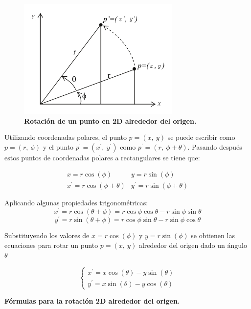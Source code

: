 \begin{center}
\begin{figure}[h]
\includegraphics[width=8cm]{Img/GEO/geo-rot2d.jpg}
\centering
\caption{\textbf{\footnotesize{Rotación de un punto en 2D alrededor del origen.}}}
\end{figure}
\end{center}

Utilizando coordenadas polares, el punto $p = (x, \ y)$ se puede escribir como $p = (r, \ \phi)$ y el punto $p^{\prime} = ({x}^{\prime},\ {y}^{\prime})$ como $p^{\prime} = (r, \ \phi + \theta)$. Pasando después estos puntos de coordenadas polares a rectangulares se tiene que:

$$
\begin{array}{rccl}
x = r \cos(\phi)  & y = r \sin(\phi)\\
{x}^{\prime} = r \cos(\phi + \theta)  & {y}^{\prime} = r \sin(\phi + \theta)
\end{array}
$$

Aplicando algunas propiedades trigonométricas:
$$
{x}^{\prime} = r \cos(\theta + \phi) = r \cos \phi \cos \theta - r \sin \phi \sin \theta
$$
$$
{y}^{\prime} = r \sin(\theta + \phi) = r \cos \phi \sin \theta - r \sin \phi \cos \theta
$$

Substituyendo los valores de $x = r \cos(\phi)$ y $y = r \sin(\phi)$ se obtienen las ecuaciones para rotar un punto $p = (x, \ y)$ alrededor del origen dado un ángulo $\theta$

\begin{equation}
\begin{cases}
{x}^{\prime} = x \cos(\theta) - y \sin(\theta) \\ 
{y}^{\prime} = x \sin(\theta) - y \cos(\theta)
\end{cases}
\end{equation}

\begin{center}
\textbf{\footnotesize{Fórmulas para la rotación 2D alrededor del origen.}}
\end{center}

